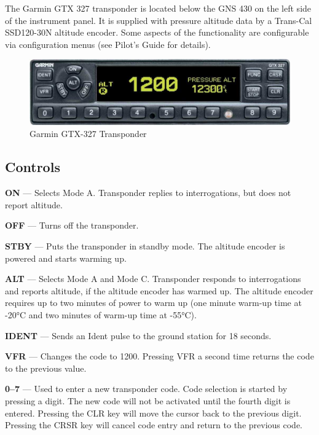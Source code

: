 The Garmin GTX 327 transponder is located below the GNS 430 on the left side of the instrument panel. It is supplied with pressure altitude data by a Trans-Cal SSD120-30N altitude encoder. Some aspects of the functionality are configurable via configuration menus (see Pilot's Guide for details).
\begin{figure}
[htb] 
\begin{center}
\includegraphics[scale=0.8]{../Diagrams/GTX327}
\end{center}
\caption{Garmin GTX-327 Transponder} 
\end{figure}

\subsection*{Controls}

\textbf{ON} --- Selects Mode A. Transponder replies to interrogations, but does not report altitude.

\textbf{OFF} --- Turns off the transponder.

\textbf{STBY} --- Puts the transponder in standby mode. The altitude encoder is powered and starts warming up. 

\textbf{ALT} --- Selects Mode A and Mode C. Transponder responds to interrogations and reports altitude, if the altitude encoder has warmed up. The altitude encoder requires up to two minutes of power to warm up (one minute warm-up time at -20°C and two minutes of warm-up time at -55°C). 

\textbf{IDENT} --- Sends an Ident pulse to the ground station for 18 seconds.

\textbf{VFR} --- Changes the code to 1200. Pressing VFR a second time returns the code to the previous value.

\textbf{0--7} --- Used to enter a new transponder code. Code selection is started by pressing a digit. The new code will not be activated until the fourth digit is entered. Pressing the CLR key will move the cursor back to the previous digit. Pressing the CRSR key will cancel code entry and return to the previous code.

